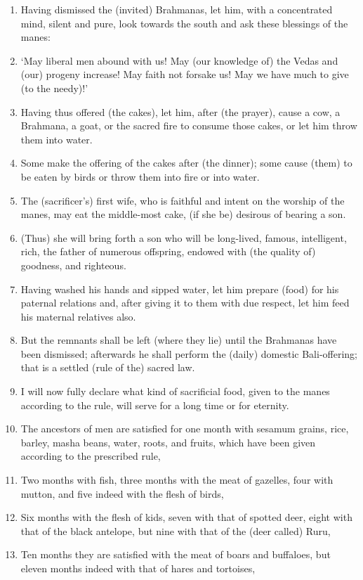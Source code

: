 \begin{enumerate}
\item Having dismissed the (invited) Brahmanas, let him, with a concentrated mind, silent and pure, look towards the south and ask these blessings of the manes:
\item `May liberal men abound with us! May (our knowledge of) the Vedas and (our) progeny increase! May faith not forsake us! May we have much to give (to the needy)!'
\item Having thus offered (the cakes), let him, after (the prayer), cause a cow, a Brahmana, a goat, or the sacred fire to consume those cakes, or let him throw them into water.
\item Some make the offering of the cakes after (the dinner); some cause (them) to be eaten by birds or throw them into fire or into water.
\item The (sacrificer's) first wife, who is faithful and intent on the worship of the manes, may eat the middle-most cake, (if she be) desirous of bearing a son.
\item (Thus) she will bring forth a son who will be long-lived, famous, intelligent, rich, the father of numerous offspring, endowed with (the quality of) goodness, and righteous.
\item Having washed his hands and sipped water, let him prepare (food) for his paternal relations and, after giving it to them with due respect, let him feed his maternal relatives also.
\item But the remnants shall be left (where they lie) until the Brahmanas have been dismissed; afterwards he shall perform the (daily) domestic Bali-offering; that is a settled (rule of the) sacred law.
\item I will now fully declare what kind of sacrificial food, given to the manes according to the rule, will serve for a long time or for eternity.
\item The ancestors of men are satisfied for one month with sesamum grains, rice, barley, masha beans, water, roots, and fruits, which have been given according to the prescribed rule,
\item Two months with fish, three months with the meat of gazelles, four with mutton, and five indeed with the flesh of birds,
\item Six months with the flesh of kids, seven with that of spotted deer, eight with that of the black antelope, but nine with that of the (deer called) Ruru,
\item Ten months they are satisfied with the meat of boars and buffaloes, but eleven months indeed with that of hares and tortoises,

\end{enumerate}
